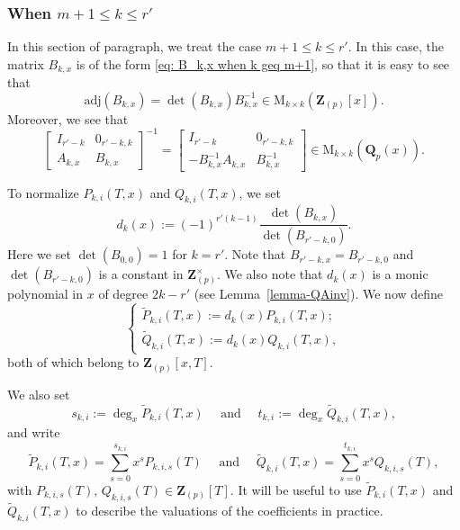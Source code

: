 \documentclass[11pt]{amsart}
\theoremstyle{definition}
\numberwithin{equation}{subsection}
\theoremstyle{plain}
\theoremstyle{plain}
\theoremstyle{plain}
\theoremstyle{plain}
\theoremstyle{plain}
\theoremstyle{plain}
\theoremstyle{plain}
\theoremstyle{plain}
\theoremstyle{plain}
\theoremstyle{plain}
\theoremstyle{plain}
\theoremstyle{plain}
\theoremstyle{definition}
\theoremstyle{definition}
\theoremstyle{definition}
\theoremstyle{remark}
\renewcommand{\(}{\textup{(}}
\renewcommand{\)}{\textup{)}}
\newcommand{\M}{\mathrm{M}}
\newcommand{\Q}{\mathbf{Q}}
\newcommand{\Z}{\mathbf{Z}}
\newcommand{\adj}{\mathrm{adj}}
\begin{document}
\subsubsection{\textbf{When $m+1\leq k\leq r'$}}
In this section of paragraph, we treat the case $m+1\leq k\leq r'$. In this case, the matrix $B_{k,x}$ is of the form \eqref{eq: B_k,x when k geq m+1}, so that it is easy to see that
\begin{equation*}
    \adj(B_{k,x})=\det(B_{k,x})B_{k,x}^{-1}
    \in \M_{k\times k}(\Z_{(p)}[x]).
\end{equation*}
Moreover, we see that
$$
            \begin{bmatrix}
        I_{r'-k} & 0_{r'-k,k}\\
        A_{k,x} & B_{k,x}
    \end{bmatrix}^{-1}
=
    \begin{bmatrix}
        I_{r'-k} & 0_{r'-k,k} \\
        -B_{k,x}^{-1}A_{k,x} & B_{k,x}^{-1}
    \end{bmatrix}\in\M_{k\times k}(\Q_p(x)).$$


To normalize $P_{k,i}(T,x)$ and $Q_{k,i}(T,x)$, we set
\begin{equation*}
    d_k(x):=(-1)^{r'(k-1)}\frac{\det(B_{k,x})}{\det(B_{r'-k,0})}.
\end{equation*}
Here we set $\det(B_{0,0})=1$ for $k=r'$. Note that $B_{r'-k,x}=B_{r'-k,0}$ and $\det(B_{r'-k,0})$ is a constant in $\Z_{(p)}^\times$. We also note that $d_{k}(x)$ is a monic polynomial in $x$ of degree $2k-r'$ (see Lemma~\ref{lemma-QAinv}).
We now define
\begin{equation*}
   \begin{cases}
    \tilde P_{k,i}(T,x):=d_k(x)P_{k,i}(T,x);\\
    \tilde Q_{k,i}(T,x):=d_k(x)Q_{k,i}(T,x),
    \end{cases}
\end{equation*}
both of which belong to $\Z_{(p)}[x,T]$.


We also set
\begin{equation*}
    s_{k,i}:=\deg_x \tilde P_{k,i}(T,x)\quad\mbox{ and }\quad
    t_{k,i}:=\deg_x \tilde Q_{k,i}(T,x),
\end{equation*}
and write
\begin{equation*}
\tilde P_{k,i}(T,x)=\sum_{s=0}^{s_{k,i}} x^s P_{k,i,s}(T)\quad\mbox{ and }\quad\tilde Q_{k,i}(T,x)=\sum_{s=0}^{t_{k,i}} x^s Q_{k,i,s}(T),
\end{equation*}
with $P_{k,i,s}(T),\, Q_{k,i,s}(T)\in \Z_{(p)}[T].$ It will be useful to use $\tilde P_{k,i}(T,x)$ and $\tilde Q_{k,i}(T,x)$ to describe the valuations of the coefficients in practice.
\end{document}
